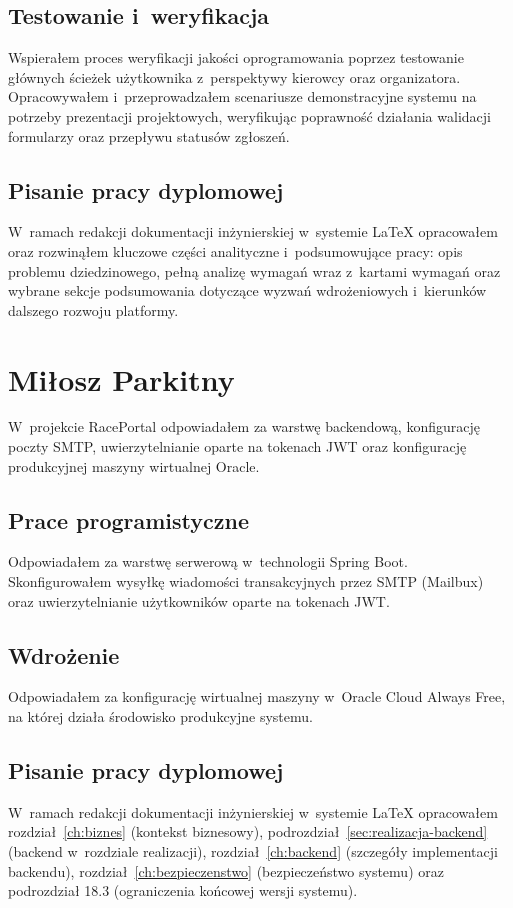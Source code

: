 \documentclass{sprz}
\begin{document}
\subsection{Testowanie i~weryfikacja}
Wspierałem proces weryfikacji jakości oprogramowania poprzez testowanie głównych ścieżek użytkownika z~perspektywy kierowcy oraz organizatora. Opracowywałem i~przeprowadzałem scenariusze demonstracyjne systemu na potrzeby prezentacji projektowych, weryfikując poprawność działania walidacji formularzy oraz przepływu statusów zgłoszeń.

\subsection{Pisanie pracy dyplomowej}
W~ramach redakcji dokumentacji inżynierskiej w~systemie \LaTeX{} opracowałem oraz rozwinąłem kluczowe części analityczne i~podsumowujące pracy: opis problemu dziedzinowego, pełną analizę wymagań wraz z~kartami wymagań oraz wybrane sekcje podsumowania dotyczące wyzwań wdrożeniowych i~kierunków dalszego rozwoju platformy.

\section{Miłosz Parkitny}
W~projekcie RacePortal odpowiadałem za warstwę backendową, konfigurację poczty SMTP, uwierzytelnianie oparte na tokenach JWT oraz konfigurację produkcyjnej maszyny wirtualnej Oracle.

\subsection{Prace programistyczne}
Odpowiadałem za warstwę serwerową w~technologii Spring Boot. Skonfigurowałem wysyłkę wiadomości transakcyjnych przez SMTP (Mailbux) oraz uwierzytelnianie użytkowników oparte na tokenach JWT.

\subsection{Wdrożenie}
Odpowiadałem za konfigurację wirtualnej maszyny w~Oracle Cloud Always Free, na której działa środowisko produkcyjne systemu.

\subsection{Pisanie pracy dyplomowej}
W~ramach redakcji dokumentacji inżynierskiej w~systemie \LaTeX{} opracowałem rozdział~\ref{ch:biznes} (kontekst biznesowy), podrozdział~\ref{sec:realizacja-backend} (backend w~rozdziale realizacji), rozdział~\ref{ch:backend} (szczegóły implementacji backendu), rozdział~\ref{ch:bezpieczenstwo} (bezpieczeństwo systemu) oraz podrozdział 18.3 (ograniczenia końcowej wersji systemu).
\end{document}
